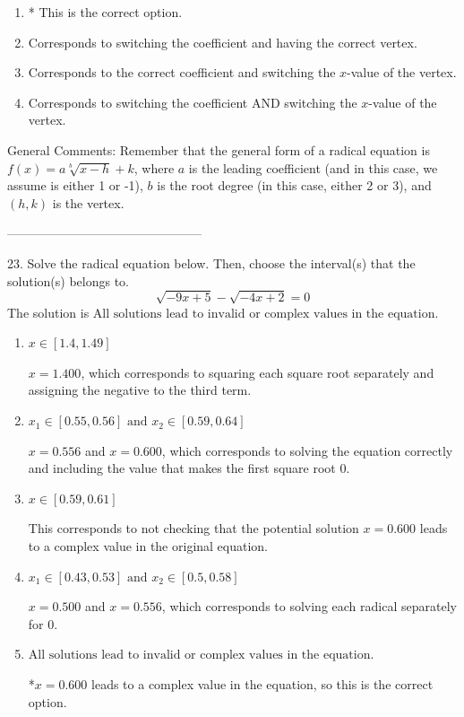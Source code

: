 \documentclass{extbook}[14pt]
\begin{document}
\begin{enumerate}[label=\Alph*.] 
\item * This is the correct option.  
\item Corresponds to switching the coefficient and having the correct vertex.  
\item Corresponds to the correct coefficient and switching the $x$-value of the vertex.  
\item Corresponds to switching the coefficient AND switching the $x$-value of the vertex.  
\end{enumerate} 
 
General Comments: Remember that the general form of a radical equation is $ f(x) = a \sqrt[b]{x - h} + k $, where $a$ is the leading coefficient (and in this case, we assume is either 1 or -1), $b$ is the root degree (in this case, either 2 or 3), and $(h, k)$ is the vertex.

-----------------------------------------------

23. Solve the radical equation below. Then, choose the interval(s) that the solution(s) belongs to.
\[ \sqrt{-9 x + 5} - \sqrt{-4 x + 2} = 0 \] 
The solution is $ \text{All solutions lead to invalid or complex values in the equation.} $ 

\begin{enumerate}[label=\Alph*.] 
\item $ x \in [1.4,1.49] $ 

 $x = 1.400$, which corresponds to squaring each square root separately and assigning the negative to the third term. 
\item $ x_1 \in [0.55, 0.56] \text{ and } x_2 \in [0.59,0.64] $ 

 $x = 0.556$ and $x = 0.600$, which corresponds to solving the equation correctly and including the value that makes the first square root 0. 
\item $ x \in [0.59,0.61] $ 

 This corresponds to not checking that the potential solution $x = 0.600$ leads to a complex value in the original equation. 
\item $ x_1 \in [0.43, 0.53] \text{ and } x_2 \in [0.5,0.58] $ 

 $x = 0.500$ and $x = 0.556$, which corresponds to solving each radical separately for 0. 
\item $ \text{All solutions lead to invalid or complex values in the equation.} $ 

 *$x = 0.600$ leads to a complex value in the equation, so this is the correct option. 
\end{enumerate} 
 
\end{document}
